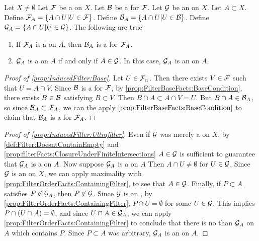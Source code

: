 \begin{prop}
\label{prop:InducedFilter}
    Let $X \neq \emptyset$ 
    Let $\mathcal{F}$ be a \Filter on $X$. 
    Let $\mathcal{B}$ be a \FilterBase for $\mathcal{F}$. 
    Let $\mathcal{G}$ be an \Ultrafilter on $X$. 
    Let $A \subset X$. 
    Define $\mathcal{F}_A =\{A \cap U | U \in \mathcal{F}\}$. 
    Define $\mathcal{B}_A =\{A \cap U | U \in \mathcal{B}\}$. 
    Define $\mathcal{G}_A= \{A \cap U | U \in \mathcal{G}\}$. 
    The following are true
    \begin{enumerate}[label=(\roman*), ref={\ref{prop:InducedFilter}.~\roman*}]
    \item  \label{prop:InducedFilter:Base} If $\mathcal{F}_A$ is a \Filter on $A$, then $\mathcal{B}_A$ is a \FilterBase for $\mathcal{F}_A$. 
    \item  \label{prop:InducedFilter:Ultrafilter} $\mathcal{G}_A$ is a \Filter on $A$ if and only if $A \in \mathcal{G}$. In this case, $\mathcal{G}_A$ is an \Ultrafilter on $A$. 
    \end{enumerate}
    \begin{proof}[Proof of \ref{prop:InducedFilter:Base}]
       Let $U \in \mathcal{F}_\alpha$. 
       Then there exists $V \in \mathcal{F}$ such that $U = A \cap V$. 
       Since $\mathcal{B}$ is a \FilterBase for $\mathcal{F}$, 
       by \ref{prop:FilterBaseFacts:BaseCondition}, 
       there exists $B \in \mathcal{B}$ satisfying $B \subset V$. 
       Then $B \cap A \subset A \cap V = U$. 
       But $B \cap A \in \mathcal{B}_A$, so since $\mathcal{B}_A \subset \mathcal{F}_A$, 
       we can the apply $\ref{prop:FilterBaseFacts:BaseCondition}$ 
       to claim that $\mathcal{B}_A$ is a \FilterBase for $\mathcal{F}_A$. 
    \end{proof}
    \begin{proof}[Proof of \ref{prop:InducedFilter:Ultrafilter}]
        Even if $\mathcal{G}$ was merely a \Filter on $X$, by
        \ref{def:Filter:DoesntContainEmpty}
        and
        \ref{prop:filterFacts:ClosureUnderFiniteIntersections}
        $A \in \mathcal{G}$ is sufficient to guarantee that $\mathcal{G}_A$ is a \Filter
        on $A$. 
        Now suppose $\mathcal{G}_A$ is a \Filter on $A$
        Then $A \cap U \neq \emptyset$ for $U \in \mathcal{G}$, 
        Since  $\mathcal{G}$ is an \Ultrafilter on $X$, 
        we can apply maximality with 
        \ref{prop:FilterOrderFacts:ContainingFilter}, 
        to see that
        $A \in \mathcal{G}$. 
        Finally, if $P \subset A$ satisfies 
        $P \not \in \mathcal{G}_A$, then 
        $P \not \in \mathcal{G}$. 
        Since $\mathcal{G}$ is an \Ultrafilter, 
        by \ref{prop:FilterOrderFacts:ContainingFilter}, 
        $P \cap U = \emptyset$ for some $U \in \mathcal{G}$. 
        This implies $P \cap \left( U \cap A\right) = \emptyset$, 
        and since $U \cap A \in \mathcal{G}_A$, 
        we can apply \ref{prop:FilterOrderFacts:ContainingFilter}
        to conclude that there is no \Filter \FinerFilter 
        than $\mathcal{G}_A$ on $A$ which contains $P$. 
        Since $P \subset A$ was arbitrary, 
        $\mathcal{G}_A$ is an \Ultrafilter on $A$. 


    \end{proof}
\end{prop}
